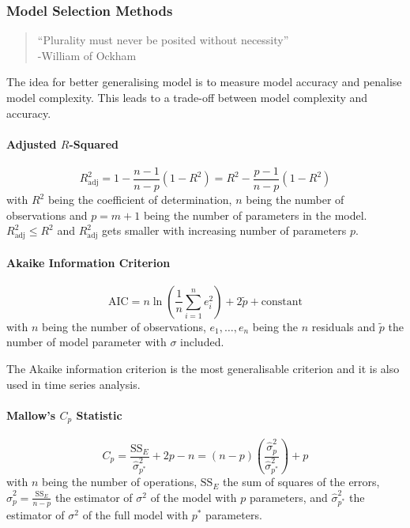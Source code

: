 \documentclass[11pt]{article}
\theoremstyle{definition}
\begin{document}
\subsubsection{Model Selection Methods}
\begin{quote}
	\textquotedblleft Plurality must never be posited without necessity\textquotedblright\\
	\hspace*{2em} -William of Ockham
\end{quote}
The idea for better generalising model is to measure model accuracy and penalise model complexity. This leads to a trade-off between model complexity and accuracy.

\paragraph{Adjusted $R$-Squared}
\begin{equation*}
	R_{\text{adj}}^2 = 1 - \frac{n-1}{n-p}(1-R^2) = R^2 - \frac{p-1}{n-p}(1-R^2)
\end{equation*}
with $R^2$ being the coefficient of determination, $n$ being the number of observations and $p=m+1$ being the number of parameters in the model. $R_{\text{adj}}^2\leq R^2$ and $R_{\text{adj}}^2$ gets smaller with increasing number of parameters $p$.

\paragraph{Akaike Information Criterion}
\begin{equation*}
	\text{AIC} = n\ln\left(\frac{1}{n}\sum_{i=1}^{n}e_i^2\right) + 2\tilde{p} + \text{constant}
\end{equation*}
with $n$ being the number of observations, $e_1,\dots,e_n$ being the $n$ residuals and $\tilde{p}$ the number of model parameter with $\sigma$ included.

The Akaike information criterion is the most generalisable criterion and it is also used in time series analysis.

\paragraph{Mallow's $C_p$ Statistic}
\begin{equation*}
	C_p = \frac{\text{SS}_{E}}{\hat{\sigma}_{p^*}^2} + 2p - n = (n-p)\left(\frac{\hat{\sigma}_{p}^2}{\hat{\sigma}_{p^*}^2}\right) + p
\end{equation*}
with $n$ being the number of operations, $\text{SS}_E$ the sum of squares of the errors, $\hat{\sigma}_{p}^2 = \frac{\text{SS}_E}{n-p}$ the estimator of $\sigma^2$ of the model with $p$ parameters, and $\hat{\sigma}_{p^*}^2$ the estimator of $\sigma^2$ of the full model with $p^*$ parameters.
\end{document}
